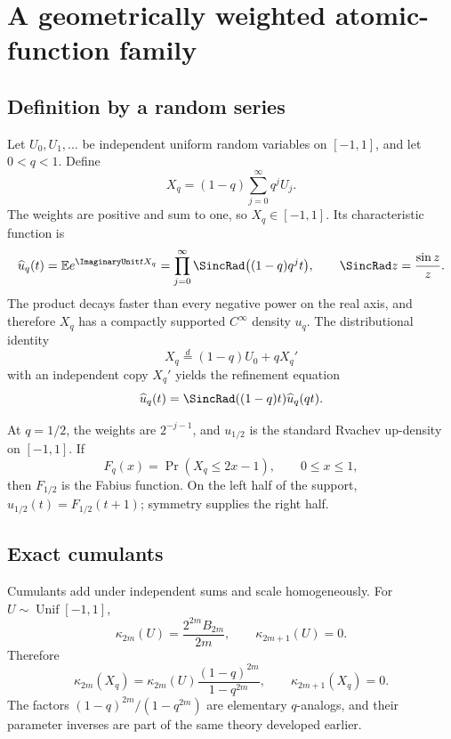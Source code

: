 \documentclass[11pt,letterpaper,oneside,openany]{book}
\theoremstyle{definition}
\theoremstyle{remark}
\begin{document}
\chapter{A geometrically weighted atomic-function family}

\section{Definition by a random series}
Let \(U_0,U_1,\ldots\) be independent uniform random variables on
\([-1,1]\), and let \(0<q<1\).  Define
\begin{equation}\label{eq:atomic-random-series}
 X_q=(1-q)\sum_{j=0}^{\infty}q^jU_j.
\end{equation}
The weights are positive and sum to one, so \(X_q\in[-1,1]\).  Its
characteristic function is
\begin{equation}\label{eq:atomic-characteristic}
 \widehat u_q(t)=\mathbb E e^{\ImaginaryUnit tX_q}
 =\prod_{j=0}^{\infty}\SincRad\bigl((1-q)q^jt\bigr),
 \qquad \SincRad z=\frac{\sin z}{z}.
\end{equation}
The product decays faster than every negative power on the real axis, and
therefore \(X_q\) has a compactly supported \(C^\infty\) density \(u_q\).
The distributional identity
\[
 X_q\overset d=(1-q)U_0+qX_q'
\]
with an independent copy \(X_q'\) yields the refinement equation
\begin{equation}\label{eq:atomic-refinement}
 \widehat u_q(t)=\SincRad((1-q)t)\widehat u_q(qt).
\end{equation}

At \(q=1/2\), the weights are \(2^{-j-1}\), and \(u_{1/2}\) is the standard
Rvachev up-density on \([-1,1]\).  If
\[
 F_q(x)=\Pr(X_q\le2x-1),\qquad 0\le x\le1,
\]
then \(F_{1/2}\) is the Fabius function.  On the left half of the support,
\(u_{1/2}(t)=F_{1/2}(t+1)\); symmetry supplies the right half.

\section{Exact cumulants}
Cumulants add under independent sums and scale homogeneously.  For
\(U\sim\operatorname{Unif}[-1,1]\),
\begin{equation}\label{eq:uniform-cumulants}
 \kappa_{2m}(U)=\frac{2^{2m}B_{2m}}{2m},
 \qquad \kappa_{2m+1}(U)=0.
\end{equation}
Therefore
\begin{equation}\label{eq:atomic-cumulants}
 \kappa_{2m}(X_q)
 =\kappa_{2m}(U)
 \frac{(1-q)^{2m}}{1-q^{2m}},
 \qquad \kappa_{2m+1}(X_q)=0.
\end{equation}
The factors \((1-q)^{2m}/(1-q^{2m})\) are elementary \(q\)-analogs, and their
parameter inverses are part of the same theory developed earlier.
\end{document}
